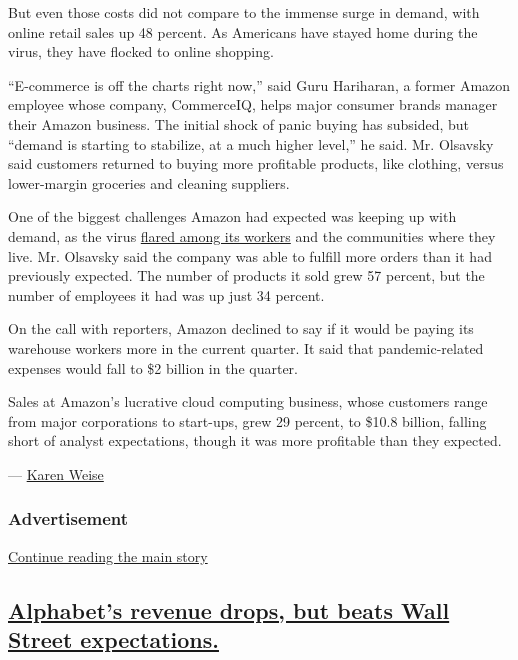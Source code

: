 But even those costs did not compare to the immense surge in demand,
with online retail sales up 48 percent. As Americans have stayed home
during the virus, they have flocked to online shopping.

``E-commerce is off the charts right now,'' said Guru Hariharan, a
former Amazon employee whose company, CommerceIQ, helps major consumer
brands manager their Amazon business. The initial shock of panic buying
has subsided, but ``demand is starting to stabilize, at a much higher
level,'' he said. Mr. Olsavsky said customers returned to buying more
profitable products, like clothing, versus lower-margin groceries and
cleaning suppliers.

One of the biggest challenges Amazon had expected was keeping up with
demand, as the virus
\href{https://www.nytimes3xbfgragh.onion/2020/05/19/technology/amazon-coronavirus-workers.html}{flared
among its workers} and the communities where they live. Mr. Olsavsky
said the company was able to fulfill more orders than it had previously
expected. The number of products it sold grew 57 percent, but the number
of employees it had was up just 34 percent.

On the call with reporters, Amazon declined to say if it would be paying
its warehouse workers more in the current quarter. It said that
pandemic-related expenses would fall to \$2 billion in the quarter.

Sales at Amazon's lucrative cloud computing business, whose customers
range from major corporations to start-ups, grew 29 percent, to \$10.8
billion, falling short of analyst expectations, though it was more
profitable than they expected.

--- \href{https://www.nytimes3xbfgragh.onion/by/karen-weise}{Karen
Weise}

\hypertarget{advertisement}{%
\subsubsection{Advertisement}\label{advertisement}}

\protect\hyperlink{after-dfp-ad-mid1}{Continue reading the main story}

\hypertarget{alphabets-revenue-drops-but-beats-wall-street-expectations}{%
\subsection{\texorpdfstring{\protect\hyperlink{alphabets-revenue-drops-but-beats-wall-street-expectations}{Alphabet's
revenue drops, but beats Wall Street
expectations.}}{Alphabet's revenue drops, but beats Wall Street expectations.}}\label{alphabets-revenue-drops-but-beats-wall-street-expectations}}

